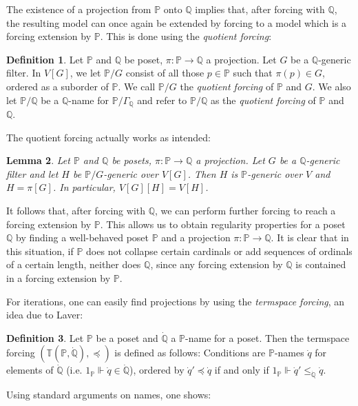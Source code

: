 \documentclass[a4paper]{amsart}
\theoremstyle{definition}
\newtheorem{mydef}{Definition}[section]
\theoremstyle{remark}
\theoremstyle{plain}
\newtheorem{mylem}[mydef]{Lemma}
\numberwithin{mydef}{section}
\newcommand{\dP}{\mathbb{P}}
\newcommand{\dQ}{\mathbb{Q}}
\newcommand{\dT}{\mathbb{T}}
\begin{document}
	The existence of a projection from $\dP$ onto $\dQ$ implies that, after forcing with $\dQ$, the resulting model can once again be extended by forcing to a model which is a forcing extension by $\dP$. This is done using the \emph{quotient forcing}:
	
	\begin{mydef}
		Let $\dP$ and $\dQ$ be poset, $\pi\colon\dP\to\dQ$ a projection. Let $G$ be a $\dQ$-generic filter. In $V[G]$, we let $\dP/G$ consist of all those $p\in\dP$ such that $\pi(p)\in G$, ordered as a suborder of $\dP$. We call $\dP/G$ the \emph{quotient forcing} of $\dP$ and $G$. We also let $\dP/\dQ$ be a $\dQ$-name for $\dP/\Gamma_{\dQ}$ and refer to $\dP/\dQ$ as the \emph{quotient forcing} of $\dP$ and $\dQ$.
	\end{mydef}
	
	The quotient forcing actually works as intended:
	
	\begin{mylem}
		Let $\dP$ and $\dQ$ be posets, $\pi\colon\dP\to\dQ$ a projection. Let $G$ be a $\dQ$-generic filter and let $H$ be $\dP/G$-generic over $V[G]$. Then $H$ is $\dP$-generic over $V$ and $H=\pi[G]$. In particular, $V[G][H]=V[H]$.
	\end{mylem}
	
	It follows that, after forcing with $\dQ$, we can perform further forcing to reach a forcing extension by $\dP$. This allows us to obtain regularity properties for a poset $\dQ$ by finding a well-behaved poset $\dP$ and a projection $\pi\colon\dP\to\dQ$. It is clear that in this situation, if $\dP$ does not collapse certain cardinals or add sequences of ordinals of a certain length, neither does $\dQ$, since any forcing extension by $\dQ$ is contained in a forcing extension by $\dP$.
	
	For iterations, one can easily find projections by using the \emph{termspace forcing}, an idea due to Laver:
	
	\begin{mydef}
		Let $\dP$ be a poset and $\dot{\dQ}$ a $\dP$-name for a poset. Then the termspace forcing $(\dT(\dP,\dot{\dQ}),\preceq)$ is defined as follows: Conditions are $\dP$-names $\dot{q}$ for elements of $\dot{\dQ}$ (i.e. $1_{\dP}\Vdash\dot{q}\in\dot{\dQ}$), ordered by $\dot{q}'\preceq\dot{q}$ if and only if $1_{\dP}\Vdash\dot{q}'\leq_{\dot{\dQ}}\dot{q}$.
	\end{mydef}
	
	Using standard arguments on names, one shows:
	
\end{document}

